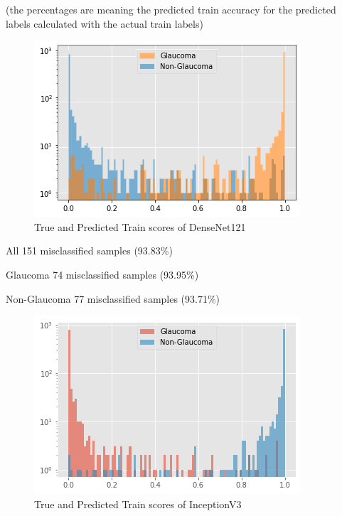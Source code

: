 \vspace{5mm}
\noindent (the percentages are meaning the predicted train accuracy for the predicted labels calculated with the actual train labels)

\vspace{5mm}
\begin{figure}[hbt!]
\centering
\includegraphics[scale=0.75]{images/fig-36.png}
\caption{True and Predicted Train scores of DenseNet121}
\label{fig:x True and Predicted Train scores of DenseNet121}
\end{figure}

\begin{center}
All  151 misclassified samples (93.83\%) 

Glaucoma  74 misclassified samples (93.95\%)

Non-Glaucoma  77 misclassified samples (93.71\%)
\end{center}
\vspace{5mm}
\begin{figure}[hbt!]
\centering
\includegraphics[scale=0.75]{images/fig-37.png}
\caption{True and Predicted Train scores of InceptionV3}
\label{fig:x True and Predicted Train scores of InceptionV3}
\end{figure}

